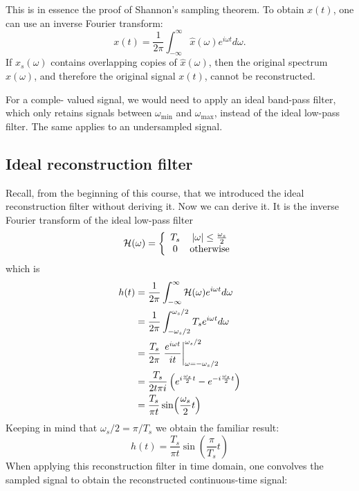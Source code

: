 This is in essence the proof of Shannon's sampling theorem. To obtain $x(t)$, one can use an inverse Fourier transform:
\begin{equation}
x(t) = \frac{1}{2\pi}\int_{-\infty}^{\infty} \hat{x}(\omega) e^{i\omega t}d\omega.
\end{equation}
If $\hat{x}_s(\omega)$ contains overlapping copies of $\hat{x}(\omega)$, then the original spectrum $\hat{x}(\omega)$, and therefore the original signal $x(t)$, cannot be reconstructed.

For a comple- valued signal, we would need to apply an ideal band-pass filter, which only retains signals between $\omega_{\mathrm{min}}$ and
$\omega_{\mathrm{max}}$, instead of the ideal low-pass filter. The same applies to an undersampled signal.

\subsection{Ideal reconstruction filter}
Recall, from the beginning of this course, that we introduced the ideal reconstruction filter without deriving it. Now we can derive it. It is the inverse Fourier transform of the ideal low-pass filter
\begin{equation}
\mathcal{H}(\omega) = \left\{ \begin{array}{cc}
T_s & |\omega| \le \frac{\omega_s}{2} \\
0 & \mathrm{otherwise}
\end{array}
\right.
\end{equation}
which is
\begin{align}
h(t) &= \frac{1}{2\pi}\int_{-\infty}^{\infty} \mathcal{H}(\omega) e^{i\omega t}d\omega \\
 &= \frac{1}{2\pi} \int_{-\omega_s/2}^{\omega_s/2} T_s e^{i\omega t}d\omega \\
 &= \frac{T_s}{2 \pi}\left. \frac{e^{i\omega t}}{it} \right|_{\omega=-\omega_s/2}^{\omega_s/2} \\
  &= \frac{T_s}{2 t \pi i}\left( e^{i\frac{\omega_s}{2} t}  - e^{-i\frac{\omega_s}{2} t} \right) \\
  &= \frac{T_s}{\pi t} \sin(\frac{\omega_s}{2}t) \\
\end{align}
Keeping in mind that $\omega_s/2 = \pi/T_s$ we obtain the familiar result:
\begin{equation}
\boxed{
h(t) = \frac{T_s}{\pi t}\sin(\frac{\pi}{T_s}t)
}
\end{equation}
When applying this reconstruction filter in time domain, one convolves the sampled signal to obtain the reconstructed continuous-time signal:
